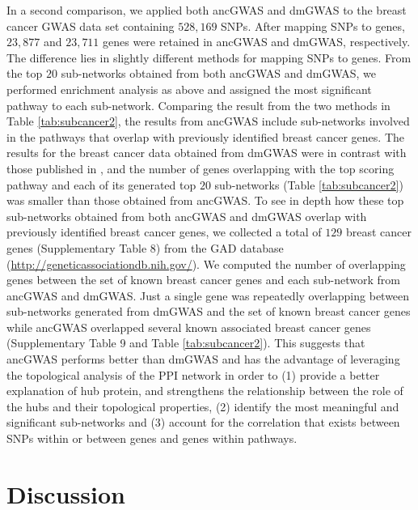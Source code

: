 \documentclass[10pt]{article}
\begin{document}
In a second comparison, we applied both ancGWAS and dmGWAS to the breast cancer GWAS data set containing $528,169$ SNPs. After mapping SNPs to genes, $23,877$ and $23,711$ genes were retained in ancGWAS and dmGWAS, respectively. The difference lies in slightly different methods for mapping SNPs to genes. From the top $20$ sub-networks obtained from both ancGWAS and dmGWAS, we performed enrichment analysis as above and assigned the most significant pathway to each sub-network. Comparing the result from the two methods in Table \ref{tab:subcancer2}, the results from ancGWAS include sub-networks involved in the pathways that overlap with previously identified breast cancer genes. The results for the breast cancer data obtained from dmGWAS were in contrast with those published in \cite{jia}, and the number of genes overlapping with the top scoring pathway and each of its generated top $20$ sub-networks (Table \ref{tab:subcancer2}) was smaller than those obtained from ancGWAS. To see in depth how these top sub-networks obtained from both ancGWAS and dmGWAS overlap with previously identified breast cancer genes, we collected a total of $129$ breast cancer genes (Supplementary Table 8) from the GAD database (\url{http://geneticassociationdb.nih.gov/}). We computed the number of overlapping genes between the set of known breast cancer genes and each sub-network from ancGWAS and dmGWAS. Just a single gene was repeatedly overlapping between sub-networks generated from dmGWAS and the set of known breast cancer genes while ancGWAS overlapped several known associated breast cancer genes (Supplementary Table 9 and Table \ref{tab:subcancer2}). This suggests that ancGWAS performs better than dmGWAS and has the advantage of leveraging the topological analysis of the PPI network in order to (1) provide a better explanation of hub protein, and strengthens the relationship between the role of the hubs and their topological properties, (2) identify the most meaningful and significant sub-networks and (3) account for the correlation that exists between SNPs within or between genes and genes within pathways.

\section*{Discussion}
\end{document}
